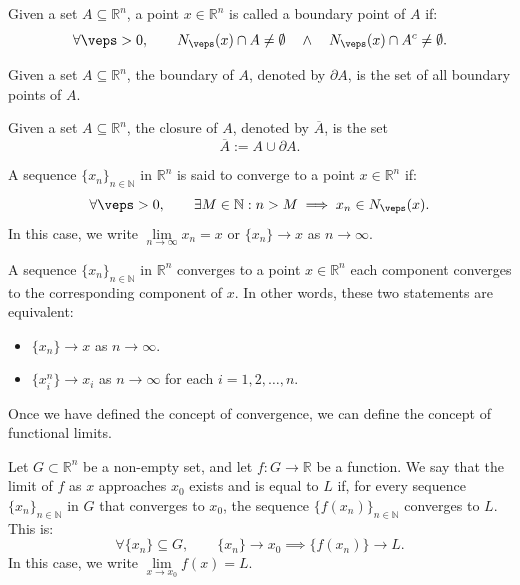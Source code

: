 \begin{definicion}
    Given a set $A \subseteq \mathbb{R}^n$, a point $x \in \mathbb{R}^n$ is called a boundary point of $A$ if:
    \begin{equation*}
        \forall \veps > 0, \qquad N_\veps(x) \cap A \neq \emptyset \quad \land \quad N_\veps(x) \cap A^c \neq \emptyset.
    \end{equation*}
\end{definicion}
\begin{definicion}[Boundary]
    Given a set $A \subseteq \mathbb{R}^n$, the boundary of $A$, denoted by $\partial A$, is the set of all boundary points of $A$.
\end{definicion}
\begin{definicion}[Closure]
    Given a set $A \subseteq \mathbb{R}^n$, the closure of $A$, denoted by $\overline{A}$, is the set
    \[
        \overline{A} := A \cup \partial A.
    \]
\end{definicion}
\begin{definicion}[Convergence]
    A sequence $\{x_n\}_{n\in \mathbb{N}}$ in $\mathbb{R}^n$ is said to converge to a point $x \in \mathbb{R}^n$ if:
    \[
        \forall \veps > 0, \qquad \exists M \in \mathbb{N} : n > M \implies x_n \in N_\veps(x).
    \]
    In this case, we write $\lim\limits_{n \to \infty} x_n = x$ or $\{ x_n \} \to x$ as $n \to \infty$.
\end{definicion}
\begin{prop}
    A sequence $\{x_n\}_{n\in \mathbb{N}}$ in $\mathbb{R}^n$ converges to a point $x \in \mathbb{R}^n$ each component converges to the corresponding component of $x$. In other words, these two statements are equivalent:
    \begin{itemize}
        \item $\{x_n\} \to x$ as $n \to \infty$.
        \item $\{x_{i}^n\} \to x_i$ as $n \to \infty$ for each $i = 1, 2, \dots, n$.
    \end{itemize}
\end{prop}

Once we have defined the concept of convergence, we can define the concept of functional limits.
\begin{definicion}
    Let $G\subset \mathbb{R}^n$ be a non-empty set, and let $f : G \to \mathbb{R}$ be a function. We say that the limit of $f$ as $x$ approaches $x_0$ exists and is equal to $L$ if, for every sequence $\{x_n\}_{n\in \mathbb{N}}$ in $G$ that converges to $x_0$, the sequence $\{f(x_n)\}_{n\in \mathbb{N}}$ converges to $L$. This is:
    \[
        \forall \{x_n\} \subseteq G, \qquad \{x_n\} \to x_0 \implies \{f(x_n)\} \to L.
    \]
    In this case, we write $\lim\limits_{x \to x_0} f(x) = L$.
\end{definicion}

